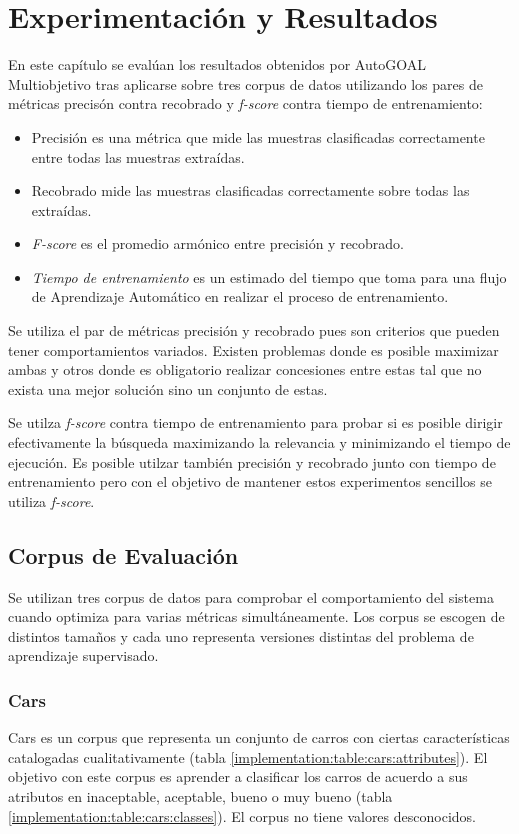 \chapter{Experimentaci\'on y Resultados}\label{chapter:experiments}
En este cap\'itulo se eval\'uan los resultados obtenidos por AutoGOAL Multiobjetivo tras aplicarse sobre tres corpus de datos utilizando los pares de m\'etricas precis\'on contra recobrado y \textit{f-score} contra tiempo de entrenamiento:
\begin{itemize}
    \item Precisi\'on es una m\'etrica que mide las muestras clasificadas correctamente entre todas las muestras extra\'idas.
    \item Recobrado mide las muestras clasificadas correctamente sobre todas las extra\'idas.
    \item \textit{F-score} es el promedio arm\'onico entre precisi\'on y recobrado.
    \item \textit{Tiempo de entrenamiento} es un estimado del tiempo que toma para una flujo de Aprendizaje Autom\'atico en realizar el proceso de entrenamiento.
\end{itemize}

Se utiliza el par de m\'etricas precisi\'on y recobrado pues son criterios que pueden tener comportamientos variados. Existen problemas donde es posible maximizar ambas y otros donde es obligatorio realizar concesiones entre estas tal que no exista una mejor soluci\'on sino un conjunto de estas.

Se utilza \textit{f-score} contra tiempo de entrenamiento para probar si es posible dirigir efectivamente  la b\'usqueda maximizando la relevancia y minimizando el tiempo de ejecuci\'on. Es posible utilzar tambi\'en precisi\'on y recobrado junto con tiempo de entrenamiento pero con el objetivo de mantener estos experimentos sencillos se utiliza \textit{f-score}.

\section{Corpus de Evaluaci\'on}
Se utilizan tres corpus de datos para comprobar el comportamiento del sistema cuando optimiza para varias m\'etricas simult\'aneamente. Los corpus se escogen de distintos tamaños y cada uno representa versiones distintas del problema de aprendizaje supervisado.

\subsection{Cars}
Cars  es un corpus que representa un conjunto de carros con ciertas caracter\'isticas catalogadas cualitativamente (tabla \ref{implementation:table:cars:attributes}). El objetivo con este corpus es aprender a clasificar los carros de  acuerdo a sus atributos  en inaceptable, aceptable, bueno o muy bueno (tabla \ref{implementation:table:cars:classes}). El corpus no tiene valores desconocidos.

